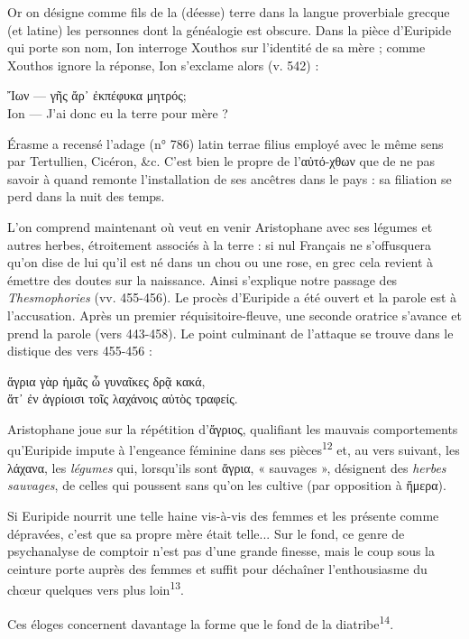 \documentclass[12pt]{book}%
\newcommand{\italique}[1]{\textit{#1}}%
\newcommand{\citComm}[1]{\begin{quoting}[vskip=0pt] #1 \end{quoting}}%
\newcommand{\latin}[1]{{\policeLat #1}}%
\newcommand{\marqueur}[1]{\textsuperscript{#1}}%
\newenvironment{groupe}{%
\pstart%
\ledgroup%
}{%
\pend %
}%
\begin{document}
\begin{pages}
\begin{Leftside}
\begin{groupe}
{{Or on désigne comme fils de la (déesse) terre dans la langue proverbiale grecque (et latine) les personnes dont la généalogie est obscure. 
Dans la pièce d'Euripide qui porte son nom, Ion interroge Xouthos sur l'identité de sa mère ; comme Xouthos ignore la réponse, Ion s'exclame alors (v. 542) :%
\citComm{Ἴων --- γῆς ἄρ᾽ ἐκπέφυκα μητρός;\\
Ion --- J'ai donc eu la terre pour mère ?}
Érasme a recensé l'adage (n° 786) latin \latin{terrae filius} employé avec le même sens par Tertullien, Cicéron, \&c.
C'est bien le propre de l'αὐτό-χθων que de ne pas savoir à quand remonte l'installation de ses ancêtres dans le pays : sa filiation se perd dans la nuit des temps.

L'on comprend maintenant où veut en venir Aristophane avec ses légumes et autres herbes, étroitement associés à la terre : si nul Français ne s'offusquera qu'on dise de lui qu'il est né dans un chou ou une rose, en grec cela revient à émettre des doutes sur la naissance.
Ainsi s'explique notre passage des \italique{Thesmophories} (vv. 455-456).
Le procès d'Euripide a été ouvert et la parole est à l'accusation. Après un premier réquisitoire-fleuve, une seconde oratrice s'avance et prend la parole (vers 443-458).
Le point culminant de l'attaque se trouve dans le distique des vers 455-456 :%
\citComm{ἄγρια γὰρ ἡμᾶς ὦ γυναῖκες δρᾷ κακά,\\
ἅτ᾽ ἐν ἀγρίοισι τοῖς λαχάνοις αὐτὸς τραφείς.}%
Aristophane joue sur la répétition d'ἄγριος, qualifiant les mauvais comportements qu'Euripide impute à l'engeance féminine dans ses pièces\marqueur{12} et, au vers suivant, les λάχανα, les \italique{légumes} qui, lorsqu'ils sont ἄγρια, « sauvages », désignent des \italique{herbes sauvages}, de celles qui poussent sans qu'on les cultive (par opposition à ἥμερα). 

Si Euripide nourrit une telle haine vis-à-vis des femmes et les présente comme dépravées, c'est que sa propre mère était telle... Sur le fond, ce genre de psychanalyse de comptoir n'est pas d'une grande finesse, mais le coup sous la ceinture porte auprès des femmes et suffit pour déchaîner l'enthousiasme du chœur quelques vers plus loin\marqueur{13}.

Ces éloges concernent davantage la forme que le fond de la diatribe\marqueur{14}.

}}
\end{groupe}
\end{Leftside}
\end{pages}
\end{document}
